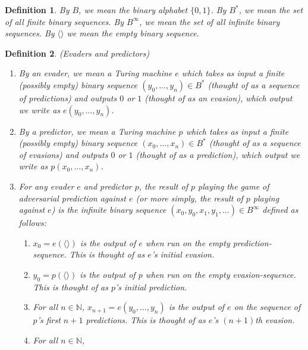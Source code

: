 \documentclass{article}
\newtheorem{definition}{Definition}
\begin{document}
\begin{definition}
By $B$, we mean the binary alphabet $\{0,1\}$. By $B^*$, we mean the set of all
finite binary sequences. By $B^\infty$, we mean the set of all infinite binary
sequences. By $\langle\rangle$ we mean the empty binary sequence.
\end{definition}

\begin{definition}
\label{evaderpredictordefn}
    (Evaders and predictors)
    \begin{enumerate}
        \item
        By an \emph{evader}, we mean a Turing machine $e$
        which takes as input a finite (possibly empty) binary sequence
        $(y_0,\ldots,y_n)\in B^*$
        (thought of as a sequence of \emph{predictions})
        and outputs $0$ or $1$ (thought of as an \emph{evasion}), which output
        we write as $e(y_0,\ldots,y_n)$.
        \item
        By a \emph{predictor}, we mean a Turing machine $p$
        which takes as input a finite (possibly empty) binary sequence
        $(x_0,\ldots,x_n)\in B^*$
        (thought of as a sequence of \emph{evasions})
        and outputs $0$ or $1$ (thought of as a \emph{prediction}), which output
        we write as $p(x_0,\ldots,x_n)$.
        \item
        For any evader $e$ and predictor $p$, the \emph{result of $p$ playing the
        game of adversarial prediction against $e$} (or more simply, the \emph{result of
        $p$ playing against $e$}) is the infinite binary sequence
        $(x_0,y_0,x_1,y_1,\ldots)\in B^\infty$
        defined as follows:
        \begin{enumerate}
            \item
            $x_0=e(\langle\rangle)$ is
            the output of $e$ when run on the empty prediction-sequence.
            This is thought of as $e$'s initial evasion.
            \item
            $y_0=p(\langle\rangle)$ is
            the output of $p$ when run on the empty evasion-sequence.
            This is thought of as $p$'s initial prediction.
            \item
            For all $n\in\mathbb N$,
            $x_{n+1}=e(y_0,\ldots,y_n)$ is
            the output of $e$ on the sequence of $p$'s first $n+1$ predictions.
            This is thought of as $e$'s $(n+1)$th evasion.
            \item
            For all $n\in\mathbb N$,

\end{enumerate}
\end{enumerate}
\end{definition}
\end{document}
